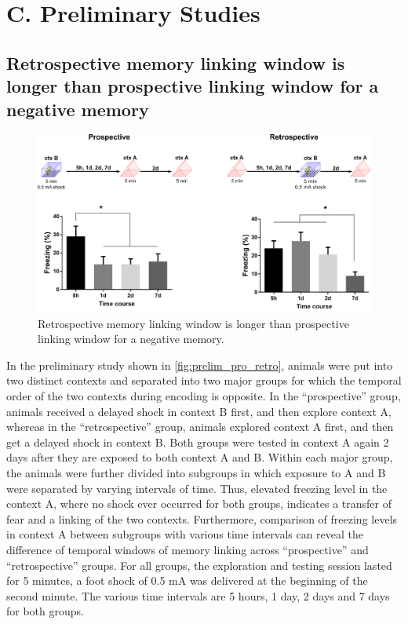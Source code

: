 \documentclass[master.tex]{subfiles}
\begin{document}
\section*{C. Preliminary Studies}

\subsection*{Retrospective memory linking window is longer than prospective
  linking window for a negative memory}

\begin{figure}
  \centering \includegraphics[scale = .095]{Figures/pro_retro_prelim.pdf}
  \caption{\footnotesize Retrospective memory linking window is longer than
    prospective linking window for a negative memory.}
  \label{fig:prelim_pro_retro}
\end{figure}


In the preliminary study shown in \autoref{fig:prelim_pro_retro}, animals were
put into two distinct contexts and separated into two major groups for which the
temporal order of the two contexts during encoding is opposite. In the
``prospective'' group, animals received a delayed shock in context B first, and
then explore context A, whereas in the ``retrospective'' group, animals explored
context A first, and then get a delayed shock in context B. Both groups were
tested in context A again 2 days after they are exposed to both context A and B.
Within each major group, the animals were further divided into subgroups in
which exposure to A and B were separated by varying intervals of time. Thus,
elevated freezing level in the context A, where no shock ever occurred for both
groups, indicates a transfer of fear and a linking of the two contexts.
Furthermore, comparison of freezing levels in context A between subgroups with
various time intervals can reveal the difference of temporal windows of memory
linking across ``prospective'' and ``retrospective'' groups. For all groups, the
exploration and testing session lasted for 5 minutes, a foot shock of 0.5 mA was
delivered at the beginning of the second minute. The various time intervals are
5 hours, 1 day, 2 days and 7 days for both groups.
\end{document}
